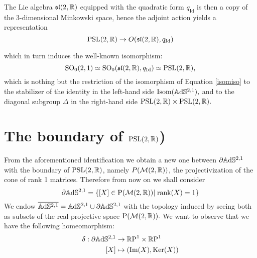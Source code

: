 \begin{observation}\label{311}
    The Lie algebra $\mathfrak{sl}(2,\mathbb{R})$ equipped with the quadratic form $q_{\text{Id}}$ is then a copy of the 3-dimensional Minkowski space, hence the adjoint action yields a representation 
    \[
        \text{PSL}(2,\mathbb{R})\to O(\mathfrak{sl}(2,\mathbb{R}),q_{\text{Id}})
    \]

which in turn induces the well-known isomorphism: 
\[
    \text{SO}_0(2,1)\simeq\text{SO}_0(\mathfrak{sl}(2,\mathbb{R}), q_\text{Id})\simeq \text{PSL}(2,\mathbb{R}),
\] which is nothing but the restriction of the isomorphism of Equation \ref{isomiso} to the stabilizer of the identity in the left-hand side $\text{Isom}(\mathbb{A}\mathrm{d}\mathbb{S}^{2,1}),$ and to the diagonal subgroup $\Delta$ in the right-hand side $\text{PSL}(2,\mathbb{R})\times\text{PSL}(2,\mathbb{R}).$
\end{observation}

\section{The boundary of $\text{PSL}(2,\mathbb{R})$)} 
From the aforementioned identification we obtain a new one between $\partial\mathbb{A}\mathrm{d}\mathbb{S}^{2,1}$ with the boundary of $\text{PSL}(2,\mathbb{R})$, namely $P(\mathcal{M}(2,\mathbb{R}))$, the projectivization of the cone of rank 1 matrices. Therefore from now on we shall consider 
\[
    \partial\mathbb{A}\mathrm{d}\mathbb{S}^{2,1}=\{[X]\in\text{P}(\mathcal{M}(2,\mathbb{R}))|\;\text{rank}(X)=1\}
\]
We endow $\overline{\mathbb{A}\mathrm{d}\mathbb{S}^{2,1}}=\mathbb{A}\mathrm{d}\mathbb{S}^{2,1}\cup\partial\mathbb{A}\mathrm{d}\mathbb{S}^{2,1}$ with the topology induced by seeing both as subsets of the real projective space $\text{P}(\mathcal{M}(2,\mathbb{R})).$ We want to observe that we have the following homeomorphism: 
\begin{align*}\label{delta}
    \delta:\partial\mathbb{A}\mathrm{d}\mathbb{S}^{2,1}&\rightarrow\mathbb{R}\text{P}^1\times\mathbb{R}\text{P}^1\\
    [X]&\mapsto (\text{Im}(X),\text{Ker}(X))
\end{align*}


